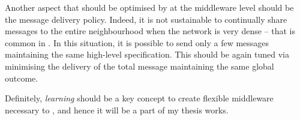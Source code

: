 \documentclass[11pt]{article}
\begin{document}
Another aspect that should be optimised by \rl{} at the middleware level should be the message delivery policy. Indeed, it is not sustainable to continually share messages to the entire neighbourhood when the network is very dense -- that is common in \cpsw{}. In this situation, it is possible to send only a few messages maintaining the same high-level specification. This should be again tuned via \rl{} minimising the delivery of the total message maintaining the same global outcome.

Definitely, \emph{learning} should be a key concept to create flexible middleware necessary to \cpsw{}, and hence it will be a part of my thesis works. 



\end{document}
